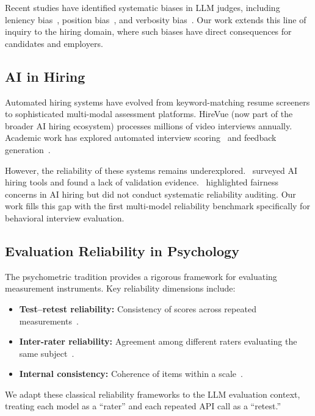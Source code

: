 \documentclass{article}
\begin{document}
Recent studies have identified systematic biases in LLM judges, including leniency bias~\cite{wang2024}, position bias~\cite{zheng2023}, and verbosity bias~\cite{saito2023}. Our work extends this line of inquiry to the hiring domain, where such biases have direct consequences for candidates and employers.

\subsection{AI in Hiring}
Automated hiring systems have evolved from keyword-matching resume screeners to sophisticated multi-modal assessment platforms. HireVue (now part of the broader AI hiring ecosystem) processes millions of video interviews annually. Academic work has explored automated interview scoring~\cite{naim2018,hemamou2019} and feedback generation~\cite{hoque2013}.

However, the reliability of these systems remains underexplored.~\cite{raghavan2020} surveyed AI hiring tools and found a lack of validation evidence.~\cite{wilson2021} highlighted fairness concerns in AI hiring but did not conduct systematic reliability auditing. Our work fills this gap with the first multi-model reliability benchmark specifically for behavioral interview evaluation.

\subsection{Evaluation Reliability in Psychology}
The psychometric tradition provides a rigorous framework for evaluating measurement instruments. Key reliability dimensions include:
\begin{itemize}
  \item \textbf{Test--retest reliability:} Consistency of scores across repeated measurements~\cite{cronbach1951}.
  \item \textbf{Inter-rater reliability:} Agreement among different raters evaluating the same subject~\cite{shrout1979}.
  \item \textbf{Internal consistency:} Coherence of items within a scale~\cite{mcdonald1999}.
\end{itemize}
We adapt these classical reliability frameworks to the LLM evaluation context, treating each model as a ``rater'' and each repeated API call as a ``retest.''
\end{document}
